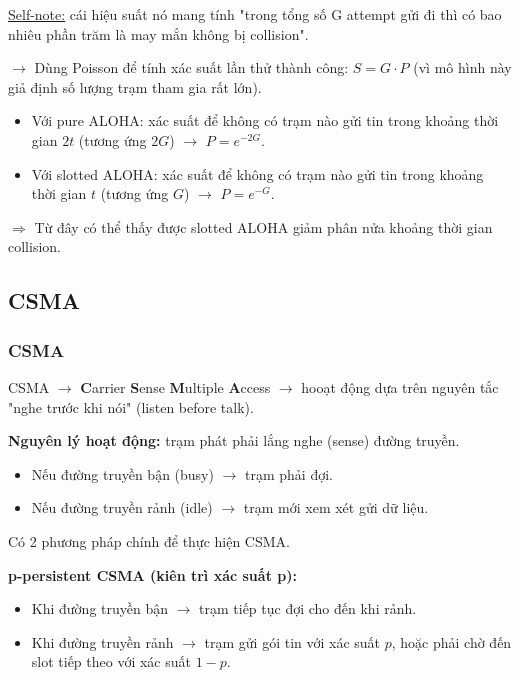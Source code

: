 \noindent
\underline{Self-note:} cái hiệu suất nó mang tính "trong tổng số G attempt gửi đi thì có bao nhiêu phần trăm là may mắn không bị collision".

$\rightarrow$ Dùng Poisson để tính xác suất lần thử thành công: $S = G \cdot P$ (vì mô hình này giả định số lượng trạm tham gia rất lớn).

\begin{itemize}
    \item[$\rightarrow$] Với pure ALOHA: xác suất để không có trạm nào gửi tin trong khoảng thời gian $2t$ (tương ứng $2G$) $\rightarrow$ $P = e^{-2G}$.
    \item[$\rightarrow$] Với slotted ALOHA: xác suất để không có trạm nào gửi tin trong khoảng thời gian $t$ (tương ứng $G$) $\rightarrow$ $P = e^{-G}$.
\end{itemize}
\medskip

\noindent
$\Rightarrow$ Từ đây có thể thấy được slotted ALOHA giảm phân nửa khoảng thời gian collision.
\medskip

\subsection{CSMA}

\subsubsection{CSMA}

\noindent
CSMA $\rightarrow$ \textbf{C}arrier \textbf{S}ense \textbf{M}ultiple \textbf{A}ccess $\rightarrow$ hooạt động dựa trên nguyên tắc "nghe trước khi nói" (listen before talk).
\medskip

\noindent
\textbf{Nguyên lý hoạt động:} trạm phát phải lắng nghe (sense) đường truyền.

\begin{itemize}
    \item Nếu đường truyền bận (busy) $\rightarrow$ trạm phải đợi.
    \item Nếu đường truyền rảnh (idle) $\rightarrow$ trạm mới xem xét gửi dữ liệu.
\end{itemize}
\medskip

\noindent
Có 2 phương pháp chính để thực hiện CSMA.
\medskip

\noindent
\textbf{p-persistent CSMA (kiên trì xác suất p):}

\begin{itemize}
    \item Khi đường truyền bận $\rightarrow$ trạm tiếp tục đợi cho đến khi rảnh.
    \item Khi đường truyền rảnh $\rightarrow$ trạm gửi gói tin với xác suất $p$, hoặc phải chờ đến slot tiếp theo với xác suất $1-p$.
\end{itemize}
\medskip

